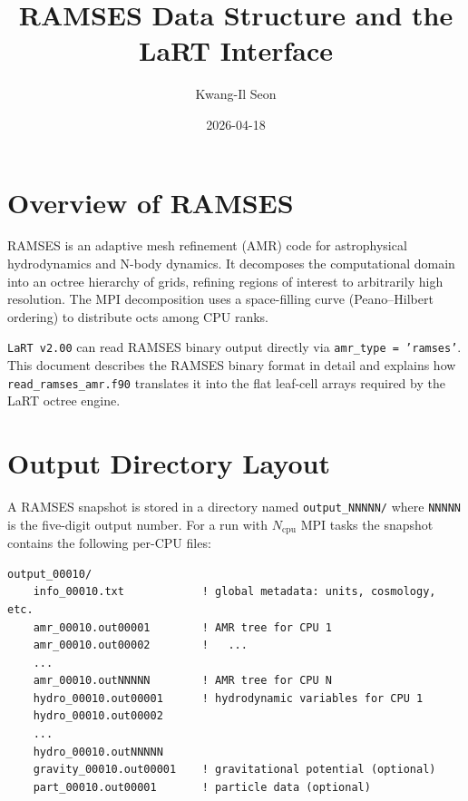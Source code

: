 \documentclass[english,a4paper]{my_memo}
\begin{document}
\title{RAMSES Data Structure and the LaRT Interface}
\author{Kwang-Il Seon}
\date{2026-04-18}
\maketitle

\tableofcontents
\bigskip

\section{Overview of RAMSES}

RAMSES \cite{teyssier2002} is an adaptive mesh refinement (AMR) code for
astrophysical hydrodynamics and N-body dynamics.  It decomposes the
computational domain into an octree hierarchy of grids, refining regions of
interest to arbitrarily high resolution.  The MPI decomposition uses a
space-filling curve (Peano--Hilbert ordering) to distribute octs among CPU
ranks.

\texttt{LaRT~v2.00} can read RAMSES binary output directly via
\texttt{amr\_type = 'ramses'}.  This document describes the RAMSES binary
format in detail and explains how \texttt{read\_ramses\_amr.f90} translates
it into the flat leaf-cell arrays required by the LaRT octree engine.

\section{Output Directory Layout}

A RAMSES snapshot is stored in a directory named
\texttt{output\_NNNNN/} where \texttt{NNNNN} is the five-digit output number.
For a run with $N_\mathrm{cpu}$ MPI tasks the snapshot contains the following
per-CPU files:

\begin{lstlisting}[style=shellstyle]
output_00010/
    info_00010.txt            ! global metadata: units, cosmology, etc.
    amr_00010.out00001        ! AMR tree for CPU 1
    amr_00010.out00002        !   ...
    ...
    amr_00010.outNNNNN        ! AMR tree for CPU N
    hydro_00010.out00001      ! hydrodynamic variables for CPU 1
    hydro_00010.out00002
    ...
    hydro_00010.outNNNNN
    gravity_00010.out00001    ! gravitational potential (optional)
    part_00010.out00001       ! particle data (optional)
\end{lstlisting}
\end{document}
